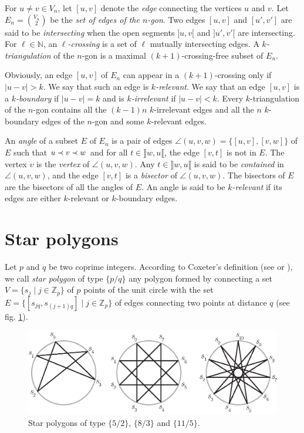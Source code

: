 \documentclass[12pt]{amsart}
\begin{document}
For $u\ne v\in V_n$, let $[u,v]$ denote the \emph{edge} connecting the vertices $u$ and $v$.
Let $E_n={V_n \choose 2}$ be the \emph{set of edges of the $n$-gon}.
Two edges $[u,v]$ and $[u',v']$ are said to be \emph{intersecting} when the open segments $]u,v[$ and $]u',v'[$ are intersecting.
For $\ell\in\mathbb{N}$, an \emph{$\ell$-crossing} is a set of $\ell$ mutually intersecting edges.
A \emph{$k$-triangulation} of the $n$-gon is a maximal $(k+1)$-crossing-free subset of $E_n$.

Obviously, an edge $[u,v]$ of $E_n$ can appear in a $(k+1)$-crossing only if $|u-v|>k$. We say that such an edge is \emph{$k$-relevant}. We say that an edge $[u,v]$ is a \emph{$k$-boundary} if $|u-v|=k$ and is \emph{$k$-irrelevant} if $|u-v|<k$.
Every $k$-triangulation of the $n$-gon contains all the $(k-1)n$ $k$-irrelevant edges and all the $n$ $k$-boundary edges of the $n$-gon and some $k$-relevant edges.

An \emph{angle} of a subset $E$ of $E_n$ is a pair of edges $\angle(u,v,w)=\{[u,v],[v,w]\}$ of $E$ such that $u\prec v\prec w$ and for all $t\in\rrbracket w,u\llbracket$, the edge $[v,t]$ is not in $E$. The vertex $v$ is the \emph{vertex} of $\angle(u,v,w)$. Any $t\in\rrbracket w,u\llbracket$ is said to be \emph{contained} in $\angle(u,v,w)$, and the edge $[v,t]$ is a \emph{bisector} of $\angle(u,v,w)$.
The bisectors of $E$ are the bisectors of all the angles of $E$.
An angle is said to be \emph{$k$-relevant} if its edges are either $k$-relevant or $k$-boundary edges.





\section{Star polygons}\label{sectionstarpolygons}

Let $p$ and $q$ be two coprime integers. According to Coxeter's definition (see \cite[ pp. 93-95]{c-rp-73} or \cite[pp. 36-38]{c-ig-73}), we call \emph{star polygon} of type $\{p/q\}$ any polygon formed by connecting a set $V=\{s_j\;|\; j\in\mathbb{Z}_p\}$ of $p$ points of the unit circle with the set $E=\{[s_{jq},s_{(j+1)q}] \;|\; j\in\mathbb{Z}_p\}$ of edges connecting two points at distance $q$ (see fig. \ref{starpolygons}).

\begin{figure}
\centerline{\includegraphics[scale=1]{starpolygons.eps}}
\caption{\small{Star polygons of type $\{5/2\}$, $\{8/3\}$ and $\{11/5\}$.}}\label{starpolygons}
\end{figure}
\end{document}

